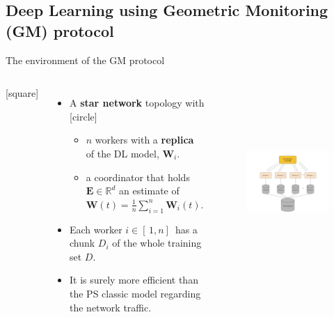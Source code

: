 \subsection{Deep Learning using Geometric Monitoring (GM) protocol}\label{subsec:deep-learning-using-gm-protocol}

\begin{frame}{The environment of the GM protocol}
    \begin{columns}
        [square]
        \begin{itemize}
            \item{A \textbf{star network} topology with
            [circle]
            \begin{itemize}
                \item $n$ workers with a \textbf{replica} of the DL model, $\pmb{W}_i$.
                \item a coordinator that holds $\pmb{E}\in\mathbb{R}^d$ an estimate of $\pmb{W}(t)=\frac{1}{n}\sum_{i=1}^n\pmb{W}_i(t)$.
            \end{itemize}}
            \vspace{0.1cm}
            \item{Each worker $i \in [\,1,n]\,$ has a chunk $D_i$ of the whole training set $D$.}
            \vspace{0.1cm}
            \item{It is surely more efficient than the PS classic model regarding the network traffic.}
        \end{itemize}
        \begin{figure}
            \includegraphics[width=8cm,height=6.5cm,center]{images/ml-fgm.png}\label{fig:ml-gm}
        \end{figure}
    \end{columns}
\end{frame}

